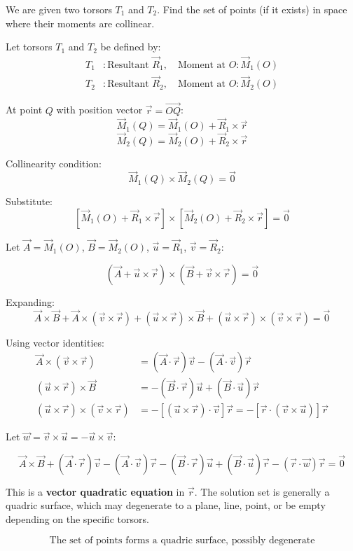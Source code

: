 \documentclass[12pt]{article}
\begin{document}
We are given two torsors $T_1$ and $T_2$. Find the set of points (if it exists) in space where their moments are collinear.

\begin{correctionbox}
Let torsors \(T_1\) and \(T_2\) be defined by:
\begin{align*}
T_1 &: \text{Resultant } \vec{R}_1, \quad \text{Moment at } O: \vec{M}_1(O) \\
T_2 &: \text{Resultant } \vec{R}_2, \quad \text{Moment at } O: \vec{M}_2(O)
\end{align*}

At point \(Q\) with position vector \(\vec{r} = \vec{OQ}\):
\[
\vec{M}_1(Q) = \vec{M}_1(O) + \vec{R}_1 \times \vec{r}
\]
\[
\vec{M}_2(Q) = \vec{M}_2(O) + \vec{R}_2 \times \vec{r}
\]

Collinearity condition:
\[
\vec{M}_1(Q) \times \vec{M}_2(Q) = \vec{0}
\]

Substitute:
\[
[\vec{M}_1(O) + \vec{R}_1 \times \vec{r}] \times [\vec{M}_2(O) + \vec{R}_2 \times \vec{r}] = \vec{0}
\]

Let \(\vec{A} = \vec{M}_1(O)\), \(\vec{B} = \vec{M}_2(O)\), \(\vec{u} = \vec{R}_1\), \(\vec{v} = \vec{R}_2\):

\[
(\vec{A} + \vec{u} \times \vec{r}) \times (\vec{B} + \vec{v} \times \vec{r}) = \vec{0}
\]

Expanding:
\[
\vec{A} \times \vec{B} 
+ \vec{A} \times (\vec{v} \times \vec{r}) 
+ (\vec{u} \times \vec{r}) \times \vec{B} 
+ (\vec{u} \times \vec{r}) \times (\vec{v} \times \vec{r}) = \vec{0}
\]

Using vector identities:
\begin{align*}
\vec{A} \times (\vec{v} \times \vec{r}) &= (\vec{A} \cdot \vec{r})\vec{v} - (\vec{A} \cdot \vec{v})\vec{r} \\
(\vec{u} \times \vec{r}) \times \vec{B} &= -(\vec{B} \cdot \vec{r})\vec{u} + (\vec{B} \cdot \vec{u})\vec{r} \\
(\vec{u} \times \vec{r}) \times (\vec{v} \times \vec{r}) &= -[(\vec{u} \times \vec{r}) \cdot \vec{v}]\vec{r} = -[\vec{r} \cdot (\vec{v} \times \vec{u})]\vec{r}
\end{align*}

Let \(\vec{w} = \vec{v} \times \vec{u} = -\vec{u} \times \vec{v}\):

\[
\vec{A} \times \vec{B} 
+ (\vec{A} \cdot \vec{r})\vec{v} 
- (\vec{A} \cdot \vec{v})\vec{r} 
- (\vec{B} \cdot \vec{r})\vec{u} 
+ (\vec{B} \cdot \vec{u})\vec{r} 
- (\vec{r} \cdot \vec{w})\vec{r} = \vec{0}
\]

This is a \textbf{vector quadratic equation} in \(\vec{r}\). The solution set is generally a quadric surface, which may degenerate to a plane, line, point, or be empty depending on the specific torsors.

\[
\boxed{\text{The set of points forms a quadric surface, possibly degenerate}}
\]
\end{correctionbox}
\end{document}
